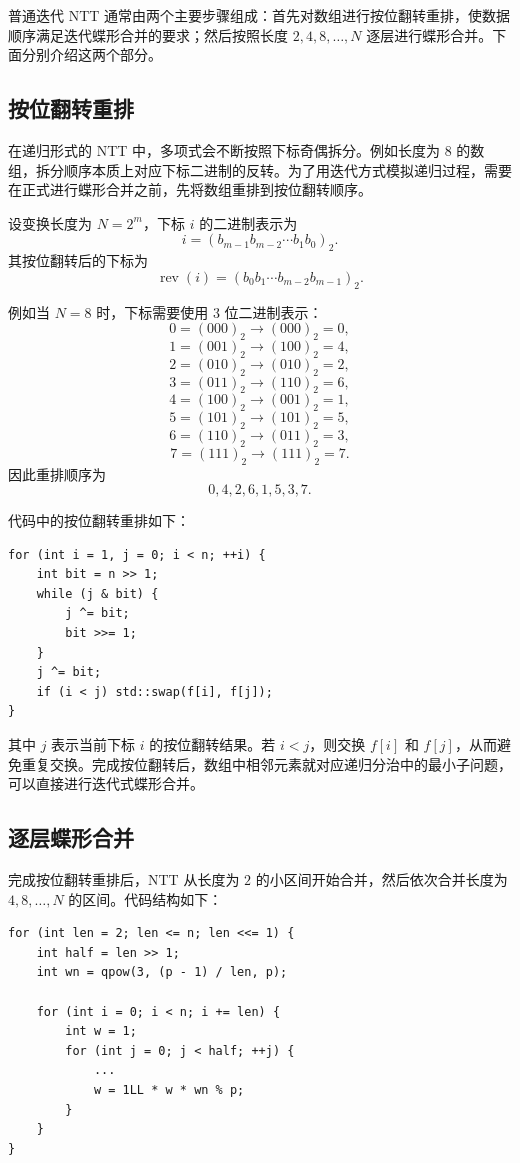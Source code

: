 \documentclass[a4paper]{article}
\begin{document}
普通迭代 NTT 通常由两个主要步骤组成：首先对数组进行按位翻转重排，使数据顺序满足迭代蝶形合并的要求；然后按照长度 \(2,4,8,\ldots,N\) 逐层进行蝶形合并。下面分别介绍这两个部分。

\subsection{按位翻转重排}

在递归形式的 NTT 中，多项式会不断按照下标奇偶拆分。例如长度为 \(8\) 的数组，拆分顺序本质上对应下标二进制的反转。为了用迭代方式模拟递归过程，需要在正式进行蝶形合并之前，先将数组重排到按位翻转顺序。

设变换长度为 \(N=2^m\)，下标 \(i\) 的二进制表示为
\[
i=(b_{m-1}b_{m-2}\cdots b_1b_0)_2.
\]
其按位翻转后的下标为
\[
\operatorname{rev}(i)=(b_0b_1\cdots b_{m-2}b_{m-1})_2.
\]

例如当 \(N=8\) 时，下标需要使用 \(3\) 位二进制表示：
\[
0=(000)_2\rightarrow(000)_2=0,
\]
\[
1=(001)_2\rightarrow(100)_2=4,
\]
\[
2=(010)_2\rightarrow(010)_2=2,
\]
\[
3=(011)_2\rightarrow(110)_2=6,
\]
\[
4=(100)_2\rightarrow(001)_2=1,
\]
\[
5=(101)_2\rightarrow(101)_2=5,
\]
\[
6=(110)_2\rightarrow(011)_2=3,
\]
\[
7=(111)_2\rightarrow(111)_2=7.
\]
因此重排顺序为
\[
0,4,2,6,1,5,3,7.
\]

代码中的按位翻转重排如下：
\begin{lstlisting}
for (int i = 1, j = 0; i < n; ++i) {
    int bit = n >> 1;
    while (j & bit) {
        j ^= bit;
        bit >>= 1;
    }
    j ^= bit;
    if (i < j) std::swap(f[i], f[j]);
}
\end{lstlisting}

其中 \(j\) 表示当前下标 \(i\) 的按位翻转结果。若 \(i<j\)，则交换 \(f[i]\) 和 \(f[j]\)，从而避免重复交换。完成按位翻转后，数组中相邻元素就对应递归分治中的最小子问题，可以直接进行迭代式蝶形合并。

\subsection{逐层蝶形合并}

完成按位翻转重排后，NTT 从长度为 \(2\) 的小区间开始合并，然后依次合并长度为 \(4,8,\ldots,N\) 的区间。代码结构如下：
\begin{lstlisting}
for (int len = 2; len <= n; len <<= 1) {
    int half = len >> 1;
    int wn = qpow(3, (p - 1) / len, p);

    for (int i = 0; i < n; i += len) {
        int w = 1;
        for (int j = 0; j < half; ++j) {
            ...
            w = 1LL * w * wn % p;
        }
    }
}
\end{lstlisting}
\end{document}
